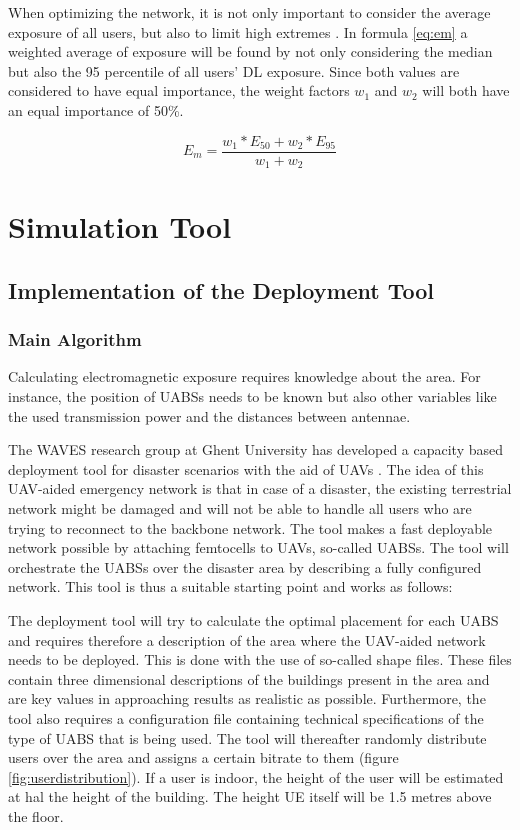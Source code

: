 When optimizing the network, it is not only important to consider the average exposure of all users, but also to limit high extremes \cite{J1}. 
In formula \ref{eq:em} a weighted average of exposure will be found by not only considering the median but also the 95 percentile of all users' DL exposure.
Since both values are considered to have equal importance, the weight factors $w_1$ and $w_2$ will both have an equal importance of 50\%. 

\begin{equation} 
E_m = \frac{w_1 * E_{50} + w_2 * E_{95}}{w_1 + w_2}
\label{eq:em}
\end{equation}


\section{Simulation Tool}

\subsection{Implementation of the Deployment Tool}
\label{sec:implementation:deploymenttool}
\subsubsection{Main Algorithm}

Calculating electromagnetic exposure requires knowledge about the area. 
For instance, the position of \gls{UABS}s needs to be known but also  other variables like
 the used transmission power and the distances between antennae.

The WAVES research group at Ghent University has developed a capacity based deployment tool for disaster scenarios with the aid of UAVs \cite{J2}.
The idea of this UAV-aided emergency network is that in case of a disaster, the existing terrestrial network might be damaged and will not be able 
to handle all users who are trying to reconnect to the backbone network. 
The tool makes a fast deployable network possible by attaching femtocells to UAVs, so-called \gls{UABS}s.
The tool will orchestrate the \gls{UABS}s over the disaster area by describing a fully configured network.
This tool is thus a suitable starting point and works as follows:

The deployment tool will try to calculate the optimal placement for each \gls{UABS} and requires therefore a description of the area where the UAV-aided network needs to 
be deployed. This is done with the use of so-called shape files. These files contain three dimensional descriptions of the buildings present in the area and are
key values in approaching results as realistic as possible. Furthermore, the tool also requires a configuration file containing technical specifications of the type of \gls{UABS} that is being used. 
The tool will thereafter randomly distribute users over the area and assigns a certain bitrate to them (figure \ref{fig:userdistribution}). If a user is indoor, the height of the user will be estimated 
at hal the height of the building. The height \gls{UE} itself will be 1.5 metres above the floor. 

